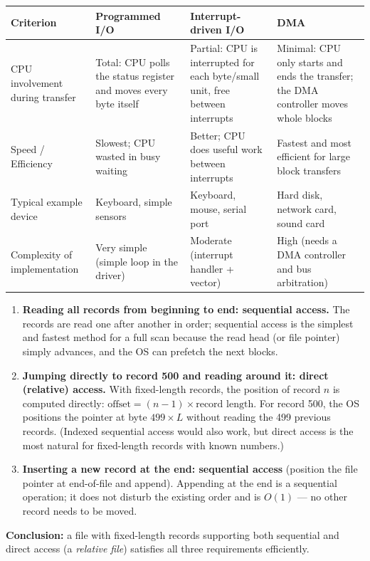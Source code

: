 \documentclass[11pt]{article}
\newcounter{popsec}
\newcounter{popsub}
\newcommand{\courssub}[1]{%
  \stepcounter{popsub}%
  \par\vspace{9pt}\noindent{\popxbold\fontsize{11.5}{13}\selectfont\color{popink}{\color{poporange}\thepopsec.\thepopsub}\hspace{6pt}#1}\par\nopagebreak\vspace{4pt}
}
\begin{document}
\courssub{Solutions — I practise}

\begin{corrige}
\begin{center}
\begin{tabularx}{\linewidth}{|l|X|X|X|}
\hline
\rowcolor{popblueL}
\textbf{Criterion} & \textbf{Programmed I/O} & \textbf{Interrupt-driven I/O} & \textbf{DMA} \\
\hline
CPU involvement during transfer & Total: CPU polls the status register and moves every byte itself & Partial: CPU is interrupted for each byte/small unit, free between interrupts & Minimal: CPU only starts and ends the transfer; the DMA controller moves whole blocks \\
\hline
Speed / Efficiency & Slowest; CPU wasted in busy waiting & Better; CPU does useful work between interrupts & Fastest and most efficient for large block transfers \\
\hline
Typical example device & Keyboard, simple sensors & Keyboard, mouse, serial port & Hard disk, network card, sound card \\
\hline
Complexity of implementation & Very simple (simple loop in the driver) & Moderate (interrupt handler + vector) & High (needs a DMA controller and bus arbitration) \\
\hline
\end{tabularx}
\end{center}
\end{corrige}

\begin{corrige}
\begin{enumerate}
\item \textbf{Reading all records from beginning to end: sequential access.} The records are read one after another in order; sequential access is the simplest and fastest method for a full scan because the read head (or file pointer) simply advances, and the OS can prefetch the next blocks.
\item \textbf{Jumping directly to record 500 and reading around it: direct (relative) access.} With fixed-length records, the position of record $n$ is computed directly: $\text{offset} = (n-1)\times \text{record length}$. For record 500, the OS positions the pointer at byte $499 \times L$ without reading the 499 previous records. (Indexed sequential access would also work, but direct access is the most natural for fixed-length records with known numbers.)
\item \textbf{Inserting a new record at the end: sequential access} (position the file pointer at end-of-file and append). Appending at the end is a sequential operation; it does not disturb the existing order and is $O(1)$ — no other record needs to be moved.
\end{enumerate}
\textbf{Conclusion:} a file with fixed-length records supporting both sequential and direct access (a \emph{relative file}) satisfies all three requirements efficiently.
\end{corrige}
\end{document}
